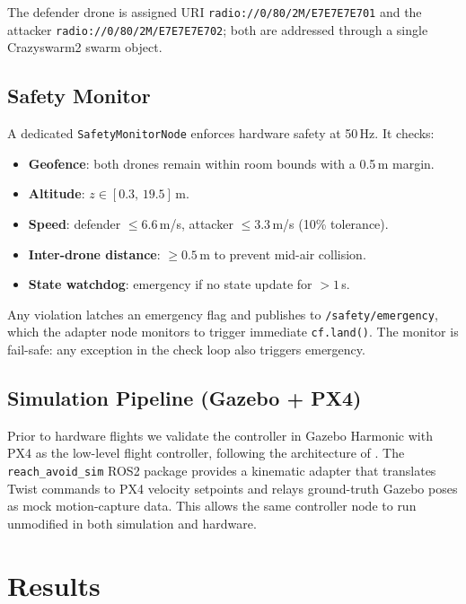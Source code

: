 \documentclass[conference]{IEEEtran}
\begin{document}
The defender drone is assigned URI \texttt{radio://0/80/2M/E7E7E7E701} and the attacker \texttt{radio://0/80/2M/E7E7E7E702}; both are addressed through a single Crazyswarm2 swarm object.

\subsection{Safety Monitor}

A dedicated \texttt{SafetyMonitorNode} enforces hardware safety at 50\,Hz. It checks:
\begin{itemize}
  \item \textbf{Geofence}: both drones remain within room bounds with a 0.5\,m margin.
  \item \textbf{Altitude}: $z \in [0.3,\,19.5]\,$m.
  \item \textbf{Speed}: defender ${\leq}6.6\,$m/s, attacker ${\leq}3.3\,$m/s (10\% tolerance).
  \item \textbf{Inter-drone distance}: ${\geq}0.5\,$m to prevent mid-air collision.
  \item \textbf{State watchdog}: emergency if no state update for $>1\,$s.
\end{itemize}
Any violation latches an emergency flag and publishes to \texttt{/safety/emergency}, which the adapter node monitors to trigger immediate \texttt{cf.land()}. The monitor is fail-safe: any exception in the check loop also triggers emergency.

\subsection{Simulation Pipeline (Gazebo + PX4)}

Prior to hardware flights we validate the controller in Gazebo Harmonic with PX4 as the low-level flight controller, following the architecture of \cite{bui2025reach}. The \texttt{reach\_avoid\_sim} ROS2 package provides a kinematic adapter that translates Twist commands to PX4 velocity setpoints and relays ground-truth Gazebo poses as mock motion-capture data. This allows the same controller node to run unmodified in both simulation and hardware.

\section{Results}
\label{sec:results}
\end{document}
